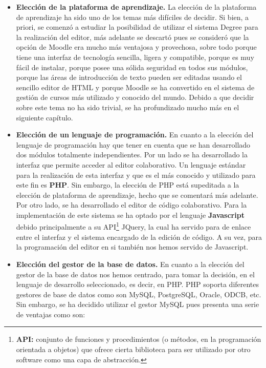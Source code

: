 \begin{itemize}
	\item \textbf{Elección de la plataforma de aprendizaje.} La elección de la plataforma de aprendizaje ha sido uno de los temas más difíciles de decidir. Si bien, a priori, se comenzó a estudiar la posibilidad de utilizar el sistema Degree para la realización del editor, más adelante se descartó pues se consideró que la opción de Moodle era mucho más ventajosa y provechosa, sobre todo porque tiene una interfaz de tecnología sencilla, ligera y compatible, porque es muy fácil de instalar, porque posee una sólida seguridad en todos sus módulos, porque las áreas de introducción de texto pueden ser editadas usando el sencillo editor de HTML y porque Moodle se ha convertido en el sistema de gestión de cursos más utilizado y conocido del mundo. Debido a que decidir sobre este tema no ha sido trivial, se ha profundizado mucho más en el siguiente capítulo.	
	\item \textbf{Elección de un lenguaje de programación.} En cuanto a la elección del lenguaje de programación hay que tener en cuenta que se han desarrollado dos módulos totalmente independientes. Por un lado se ha desarrollado la interfaz que permite acceder al editor colaborativo. Un lenguaje estándar para la realización de esta interfaz y que es el más conocido y utilizado para este fin es \textbf{PHP}. Sin embargo, la elección de PHP está supeditada a la elección de plataforma de aprendizaje, hecho que se comentará más adelante. Por otro lado, se ha desarrollado el editor de código colaborativo. Para la implementación de este sistema se ha optado por el lenguaje \textbf{Javascript} debido principalmente a su API\footnote{\textbf{API: }conjunto de funciones y procedimientos (o métodos, en la programación orientada a objetos) que ofrece cierta biblioteca para ser utilizado por otro software como una capa de abstracción.} JQuery, la cual ha servido para de enlace entre el interfaz y el sistema encargado de la edición de código. A su vez, para la programación del editor en si también nos hemos servido de Javascript.	
	\item \textbf{Elección del gestor de la base de datos.} En cuanto a la elección del gestor de la base de datos nos hemos centrado, para tomar la decisión, en el lenguaje de desarrollo seleccionado, es decir, en PHP. PHP soporta diferentes gestores de base de datos como son MySQL, PostgreSQL, Oracle, ODCB, etc. Sin embargo, se ha decidido utilizar el gestor MySQL pues presenta una serie de ventajas como son:
		\begin{itemize}

\end{itemize}
\end{itemize}
